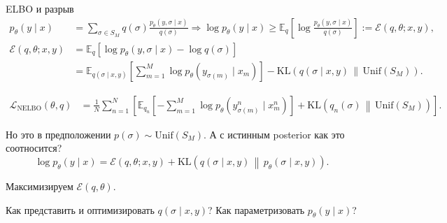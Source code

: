 \documentclass[aspectratio=43, 10pt]{beamer}
\newcommand{\E}{\mathbb{E}}
\newcommand{\KL}{\mathrm{KL}}
\newcommand{\Unif}{\mathrm{Unif}}
\begin{document}
\begin{frame}{ELBO и разрыв}
\footnotesize
\[
\begin{aligned}
  p_\theta(y\mid x)
  &=
  \sum_{\sigma\in S_M}q(\sigma)
  \frac{p_\theta(y,\sigma\mid x)}{q(\sigma)} 
  \Rightarrow  \log p_\theta(y\mid x) \ge  \E_q\left[  \log\frac{p_\theta(y,\sigma\mid x)}{q(\sigma)}  \right]  :=\mathcal{E}(q,\theta;x,y),\\
  \mathcal{E}(q,\theta;x,y)
  &=
  \E_q\left[
    \log p_\theta(y,\sigma\mid x)-\log q(\sigma)
  \right]\\
  &=
  \E_{q(\sigma\mid x,y)}
  \left[
    \sum_{m=1}^{M}
    \log p_\theta(y_{\sigma(m)}\mid x_m)
  \right]
  -
  \KL\!\left(
    q(\sigma\mid x,y)\,\middle\|\,\Unif(S_M)
  \right).
\end{aligned}
\]

\vspace{-0.4em}
\[
\boxed{
\begin{aligned}
  \mathcal L_{\mathrm{NELBO}}(\theta,q)
  &=
  \frac{1}{N}\sum_{n=1}^{N}
  \left[
  \E_{q_n}
  \left[
  -\sum_{m=1}^{M}\log p_\theta(y^n_{\sigma(m)}\mid x^n_m)
  \right]
  +
  \KL\!\left(q_n(\sigma)\,\middle\|\,\Unif(S_M)\right)
  \right].
\end{aligned}
}
\]

\footnotesize

Но это в предположении $p(\sigma)\sim\Unif(S_M)$. А с истинным posterior как это соотносится?
\[
\boxed{
  \log p_\theta(y\mid x)
  =
  \mathcal{E}(q,\theta;x,y)
  +
  \KL\!\left(
  q(\sigma\mid x,y)\,\middle\|\,p_\theta(\sigma\mid x,y)
  \right).
}
\]

\vspace{-0.3em}
\footnotesize
Максимизируем $\mathcal{E}(q,\theta)$.

\vspace{0.3em}
\begin{block}{}
\centering
Как представить и оптимизировать $q(\sigma\mid x,y)$? Как параметризовать $p_\theta(y\mid x)$?
\end{block}
\end{frame}
\end{document}
